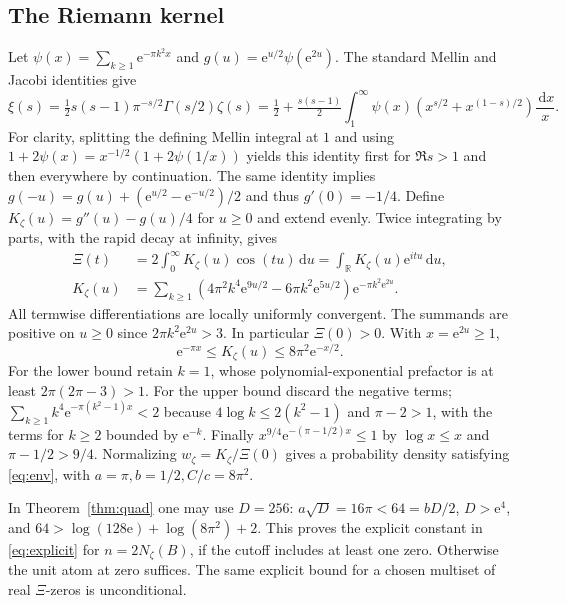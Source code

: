 \documentclass[11pt]{article}
\theoremstyle{remark}\newtheorem{remark}[theorem]{Remark}
\newcommand{\R}{\mathbb R}
\newcommand{\e}{\mathrm e}
\newcommand{\dd}{\,\mathrm d}
\begin{document}
\subsection{The Riemann kernel}
Let $\psi(x)=\sum_{k\ge1}\e^{-\pi k^2x}$ and $g(u)=\e^{u/2}\psi(\e^{2u})$. The standard Mellin and Jacobi identities give \cite{titchmarsh,edwards}
\[
 \xi(s)=\tfrac12s(s-1)\pi^{-s/2}\Gamma(s/2)\zeta(s)
 =\tfrac12+\tfrac{s(s-1)}2\int_1^\infty\psi(x)(x^{s/2}+x^{(1-s)/2})\frac{\dd x}{x}.
\]
For clarity, splitting the defining Mellin integral at $1$ and using $1+2\psi(x)=x^{-1/2}(1+2\psi(1/x))$ yields this identity first for $\Re s>1$ and then everywhere by continuation. The same identity implies $g(-u)=g(u)+(\e^{u/2}-\e^{-u/2})/2$ and thus $g'(0)=-1/4$. Define $K_\zeta(u)=g''(u)-g(u)/4$ for $u\ge0$ and extend evenly. Twice integrating by parts, with the rapid decay at infinity, gives
\begin{align*}
 \Xi(t)&=2\int_0^\infty K_\zeta(u)\cos(tu)\dd u
 =\int_{\R}K_\zeta(u)\e^{itu}\dd u,\\
 K_\zeta(u)&=\sum_{k\ge1}\left(4\pi^2k^4\e^{9u/2}-6\pi k^2\e^{5u/2}\right)\e^{-\pi k^2\e^{2u}}.
\end{align*}
All termwise differentiations are locally uniformly convergent. The summands are positive on $u\ge0$ since $2\pi k^2\e^{2u}>3$. In particular $\Xi(0)>0$. With $x=\e^{2u}\ge1$,
\begin{equation}\label{eq:zetaenv}
 \e^{-\pi x}\le K_\zeta(u)\le 8\pi^2\e^{-x/2}.
\end{equation}
For the lower bound retain $k=1$, whose polynomial-exponential prefactor is at least $2\pi(2\pi-3)>1$. For the upper bound discard the negative terms; $\sum_{k\ge1} k^4\e^{-\pi(k^2-1)x}<2$ because $4\log k\le2(k^2-1)$ and $\pi-2>1$, with the terms for $k\ge2$ bounded by $\e^{-k}$. Finally $x^{9/4}\e^{-(\pi-1/2)x}\le1$ by $\log x\le x$ and $\pi-1/2>9/4$. Normalizing $w_\zeta=K_\zeta/\Xi(0)$ gives a probability density satisfying \eqref{eq:env}, with $a=\pi,b=1/2,C/c=8\pi^2$.

In Theorem~\ref{thm:quad} one may use $D=256$: $a\sqrt D=16\pi<64=bD/2$, $D>\e^4$, and $64>\log(128\e)+\log(8\pi^2)+2$. This proves the explicit constant in \eqref{eq:explicit} for $n=2N_\zeta(B)$, if the cutoff includes at least one zero. Otherwise the unit atom at zero suffices. The same explicit bound for a chosen multiset of real $\Xi$-zeros is unconditional.
\end{document}
